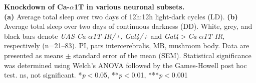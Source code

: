 \label{fig:6}
\textbf{Knockdown of Ca-$\alpha$1T in various neuronal subsets.}
\\
\textbf {(a)} Average total sleep over two days of 12h:12h light-dark cycles (LD).
\textbf {(b)} Average total sleep over two days of continuous darkness (DD).
White, grey, and black bars denote \emph{UAS-Ca-$\alpha$1T-IR/+}, \emph{Gal4/+} and \emph{Gal4$>$Ca-$\alpha$1T-IR}, respectively (n=21--83).
PI, pars intercerebralis, MB, mushroom body. 
Data are presented as means $\pm$ standard error of the mean (SEM).
Statistical significance was determined using Welch's ANOVA followed by the Games-Howell post hoc test.
ns, not significant.
*\emph{p}$<$0.05, **\emph{p}$<$0.01, ***\emph{p}$<$0.001
